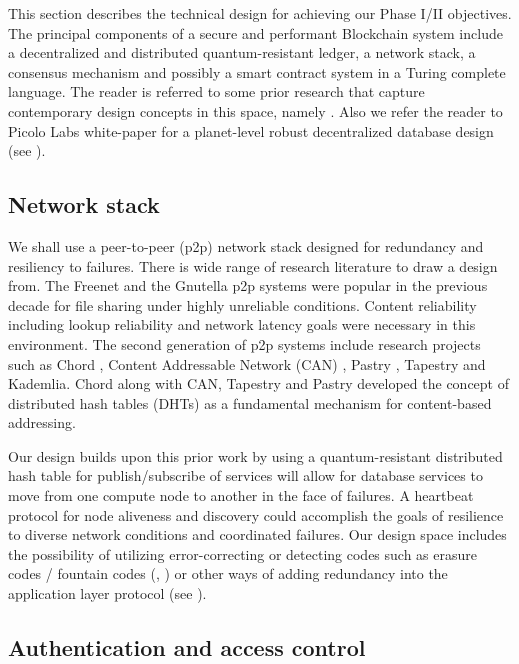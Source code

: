 \label{sec:design} This section describes the technical design for achieving our Phase I/II objectives. The principal
components of a secure and performant Blockchain system include a decentralized and distributed quantum-resistant ledger, a network stack,
a consensus mechanism and possibly a smart contract system in a Turing complete language. The reader is referred to some
prior research that capture contemporary design concepts in this space, namely \cite{micali16, garay2015, ava2018}. Also
we refer the reader to Picolo Labs white-paper for a planet-level robust decentralized database design (see
\cite{picolo2018}).

\subsection{Network stack}

We shall use a peer-to-peer (p2p) network stack designed for redundancy and resiliency to failures. There is wide range of research
literature to draw a design from.  The Freenet \cite{freenet_thesis, Clarke_2001} and the Gnutella \cite{Gnutella} p2p
systems were popular in the previous decade for file sharing under highly unreliable conditions.
Content reliability including lookup reliability and network latency goals were necessary in
this environment. The second generation of p2p systems include research projects such as Chord \cite{Stoica_2001},
Content Addressable Network (CAN) \cite{Ratnasamy_2001}, Pastry \cite{Rowstron_2001}, Tapestry \cite{tapestry2004} and
Kademlia. Chord along with CAN, Tapestry and Pastry developed the concept of distributed hash tables (DHTs) as a
fundamental mechanism for content-based addressing.

Our design builds upon this prior work by using a quantum-resistant distributed hash table for
publish/subscribe of services will allow for database services to move from one compute node to another in the face of
failures. A heartbeat protocol for node aliveness and discovery could accomplish the goals of resilience to diverse
network conditions and coordinated failures. Our design space includes the possibility of utilizing error-correcting or
detecting codes such as erasure codes / fountain codes (\cite{byers1998}, \cite{hu2013}) or other ways of adding
redundancy into the application layer protocol (see \cite{bloxroute}).

\subsection{Authentication and access control}

